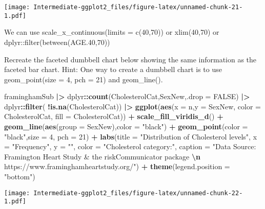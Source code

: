 \documentclass[
]{article}
\newenvironment{Shaded}{\begin{snugshade}}{\end{snugshade}}
\newcommand{\AttributeTok}[1]{\textcolor[rgb]{0.13,0.29,0.53}{#1}}
\newcommand{\ConstantTok}[1]{\textcolor[rgb]{0.56,0.35,0.01}{#1}}
\newcommand{\DecValTok}[1]{\textcolor[rgb]{0.00,0.00,0.81}{#1}}
\newcommand{\FunctionTok}[1]{\textcolor[rgb]{0.13,0.29,0.53}{\textbf{#1}}}
\newcommand{\NormalTok}[1]{#1}
\newcommand{\SpecialCharTok}[1]{\textcolor[rgb]{0.81,0.36,0.00}{\textbf{#1}}}
\newcommand{\StringTok}[1]{\textcolor[rgb]{0.31,0.60,0.02}{#1}}
\begin{document}
\texttt{[image: Intermediate-ggplot2\_files/figure-latex/unnamed-chunk-21-1.pdf]}

We can use scale\_x\_continuous(limits = c(40,70)) or xlim(40,70) or
dplyr::filter(between(AGE.40,70))

Recreate the faceted dumbbell chart below showing the same information
as the faceted bar chart. Hint: One way to create a dumbbell chart is to
use geom\_point(size = 4, pch = 21) and geom\_line().

\begin{Shaded}
\begin{Highlighting}[]
\NormalTok{framinghamSub }\SpecialCharTok{|\textgreater{}} 
\NormalTok{  dplyr}\SpecialCharTok{::}\FunctionTok{count}\NormalTok{(CholesterolCat,SexNew,}\AttributeTok{.drop =} \ConstantTok{FALSE}\NormalTok{) }\SpecialCharTok{|\textgreater{}}
\NormalTok{  dplyr}\SpecialCharTok{::}\FunctionTok{filter}\NormalTok{( }\SpecialCharTok{!}\FunctionTok{is.na}\NormalTok{(CholesterolCat)) }\SpecialCharTok{|\textgreater{}}
  \FunctionTok{ggplot}\NormalTok{(}\FunctionTok{aes}\NormalTok{(}\AttributeTok{x =}\NormalTok{ n,}\AttributeTok{y =}\NormalTok{ SexNew, }\AttributeTok{color =}\NormalTok{ CholesterolCat, }\AttributeTok{fill =}\NormalTok{ CholesterolCat)) }\SpecialCharTok{+} 
  \FunctionTok{scale\_fill\_viridis\_d}\NormalTok{() }\SpecialCharTok{+}
  \FunctionTok{geom\_line}\NormalTok{(}\FunctionTok{aes}\NormalTok{(}\AttributeTok{group =}\NormalTok{ SexNew),}\AttributeTok{color =} \StringTok{"black"}\NormalTok{) }\SpecialCharTok{+}
  \FunctionTok{geom\_point}\NormalTok{(}\AttributeTok{color =} \StringTok{"black"}\NormalTok{,}\AttributeTok{size =} \DecValTok{4}\NormalTok{, }\AttributeTok{pch =} \DecValTok{21}\NormalTok{) }\SpecialCharTok{+}
  \FunctionTok{labs}\NormalTok{(}\AttributeTok{title =} \StringTok{"Distribution of Cholesterol levels"}\NormalTok{,}
       \AttributeTok{x =} \StringTok{"Frequency"}\NormalTok{,}
       \AttributeTok{y =} \StringTok{""}\NormalTok{,}
       \AttributeTok{color =} \StringTok{"Cholesterol category:"}\NormalTok{,}
       \AttributeTok{caption =} \StringTok{"Data Source: Framington Heart Study \& the riskCommunicator package }\SpecialCharTok{\textbackslash{}n}\StringTok{ https://www.framinghamheartstudy.org/"}\NormalTok{) }\SpecialCharTok{+}
  \FunctionTok{theme}\NormalTok{(}\AttributeTok{legend.position =} \StringTok{"bottom"}\NormalTok{)}
\end{Highlighting}
\end{Shaded}

\texttt{[image: Intermediate-ggplot2\_files/figure-latex/unnamed-chunk-22-1.pdf]}
\end{document}
